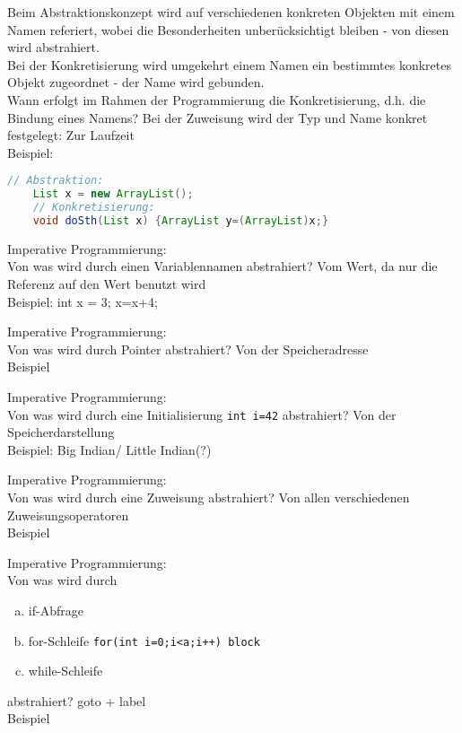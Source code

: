 \begin{card}
	Beim Abstraktionskonzept wird auf verschiedenen konkreten Objekten mit einem Namen referiert, wobei die Besonderheiten unberücksichtigt bleiben - von diesen wird abstrahiert.\\
	Bei der Konkretisierung wird umgekehrt einem Namen ein bestimmtes konkretes Objekt zugeordnet - der Name wird gebunden.\\
	Wann erfolgt im Rahmen der Programmierung die Konkretisierung, d.h. die Bindung	eines Namens?
	\hr
	Bei der Zuweisung wird der Typ und Name konkret festgelegt: Zur Laufzeit\\
	Beispiel:
	\begin{lstlisting}[language=Java]
	// Abstraktion:
	List x = new ArrayList();
	// Konkretisierung:
	void doSth(List x) {ArrayList y=(ArrayList)x;}
	\end{lstlisting}
\end{card}

\begin{card}
	Imperative Programmierung:\\
	Von was wird durch einen Variablennamen abstrahiert?
	\hr
	Vom Wert, da nur die Referenz auf den Wert benutzt wird\\
		Beispiel: int x = 3; x=x+4;
\end{card}

\begin{card}
	Imperative Programmierung:\\
	Von was wird durch Pointer abstrahiert?
	\hr
	Von der Speicheradresse\\
		Beispiel
\end{card}

\begin{card}
	Imperative Programmierung:\\
	Von was wird durch eine Initialisierung \texttt{int i=42} abstrahiert?
	\hr
	Von der Speicherdarstellung	\\
	Beispiel: Big Indian/ Little Indian(?)
\end{card}

\begin{card}
	Imperative Programmierung:\\
	Von was wird durch eine Zuweisung abstrahiert?
	\hr
	Von allen verschiedenen Zuweisungsoperatoren\\
		Beispiel
\end{card}

\begin{card}
	Imperative Programmierung:\\
	Von was wird durch 
	\begin{enumerate}[a)]
	\item if-Abfrage
	\item for-Schleife \texttt{for(int i=0;i<a;i++) block} 
	\item while-Schleife
	\end{enumerate}
	abstrahiert?
	\hr
	goto + label\\
	Beispiel
\end{card}

